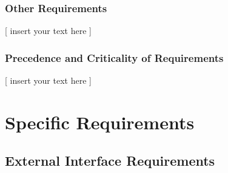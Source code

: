 \documentclass[twoside,letterpaper]{article}
\begin{document}
\subsubsection{Other Requirements}

[ insert your text here ] %

\subsubsection{Precedence and Criticality of Requirements}

[ insert your text here ] %

\section{Specific Requirements}

\subsection{External Interface Requirements}
\end{document}
